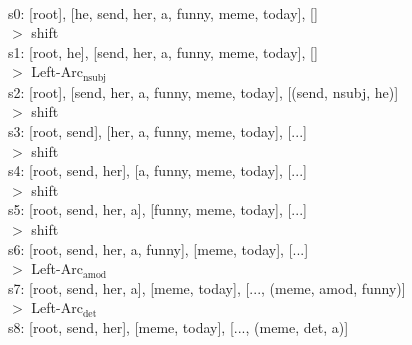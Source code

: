 \documentclass[twoside,11pt]{homework}
\begin{document}
\begin{solution}
  \ \\
  s0: [root], [he, send, her, a, funny, meme, today], []\\
  $>$ shift\\
  s1: [root, he], [send, her, a, funny, meme, today], []\\
  $>$ Left-Arc$_{\text{nsubj}}$\\
  s2: [root], [send, her, a, funny, meme, today], [(send, nsubj, he)]\\
  $>$ shift\\
  s3: [root, send], [her, a, funny, meme, today], [...]\\
  $>$ shift\\
  s4: [root, send, her], [a, funny, meme, today], [...]\\
  $>$ shift\\
  s5: [root, send, her, a], [funny, meme, today], [...]\\
  $>$ shift\\
  s6: [root, send, her, a, funny], [meme, today], [...]\\
  $>$ Left-Arc$_{\text{amod}}$\\
  s7: [root, send, her, a], [meme, today], [..., (meme, amod, funny)]\\
  $>$ Left-Arc$_{\text{det}}$\\
  s8: [root, send, her], [meme, today], [..., (meme, det, a)]\\
  


\end{solution}
\end{document}
